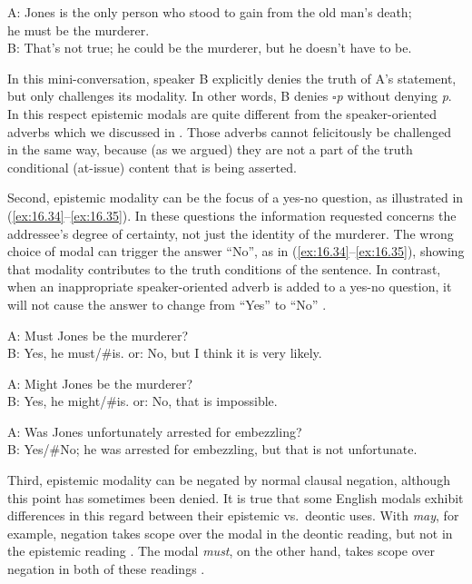 \ea \label{ex:16.33}
A: Jones is the only person who stood to gain from the old man’s death;\\
\hspace{1cm} he must be the murderer.\\
B: That’s not true; he could be the murderer, but he doesn’t have to be.
\z


In this mini-conversation, speaker B explicitly denies the truth of A’s statement, but only challenges its modality. In other words, B denies \textit{${\square}$p} without denying \textit{p}. In this respect epistemic modals are quite different from the speaker-oriented adverbs which we discussed in . Those adverbs cannot felicitously be challenged in the same way, because (as we argued) they are not a part of the truth conditional (at-issue) content that is being asserted.



Second, epistemic modality can be the focus of a yes-no question, as illustrated in (\ref{ex:16.34}--\ref{ex:16.35}). In these questions the information requested concerns the addressee’s degree of certainty, not just the identity of the murderer. The wrong choice of modal can trigger the answer “No”, as in (\ref{ex:16.34}--\ref{ex:16.35}), showing that modality contributes to the truth conditions of the sentence. In contrast, when an inappropriate speaker-oriented adverb is added to a yes-no question, it will not cause the answer to change from “Yes” to “No” .


\ea \label{ex:16.34}
A: Must Jones be the murderer?\\
B: Yes, he must/\#is.  or: No, but I think it is very likely.
\z

\ea \label{ex:16.35}
A: Might Jones be the murderer?\\
B: Yes, he might/\#is.  or: No, that is impossible.
\z

\ea \label{ex:16.36}
A: Was Jones unfortunately arrested for embezzling?\\
B: Yes/\#No; he was arrested for embezzling, but that is not unfortunate.
\z


Third, epistemic modality can be negated by normal clausal negation, although this point has sometimes been denied. It is true that some English modals exhibit differences in this regard between their epistemic vs.~deontic uses. With \textit{may}, for example, negation takes scope over the modal in the deontic reading, but not in the epistemic reading . The modal \textit{must}, on the other hand, takes scope over negation in both of these readings .


